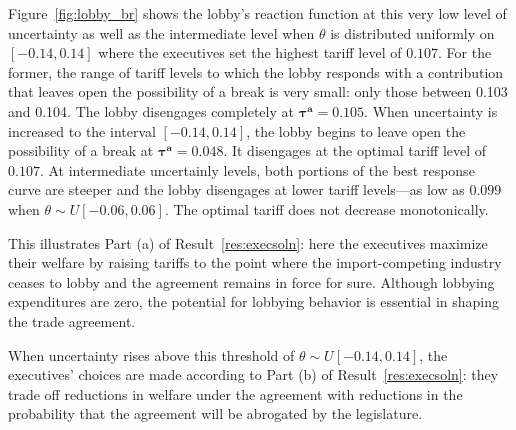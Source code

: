\documentclass[10pt]{article}
\newcommand{\ve}{\theta}
\newcommand{\bta}{\bm{\tau^a}}
\begin{document}
Figure~\ref{fig:lobby_br} shows the lobby's reaction function at this very low level of uncertainty as well as the intermediate level when $\ve$ is distributed uniformly on $[-0.14,0.14]$ where the executives set the highest tariff level of $0.107$. For the former, the range of tariff levels to which the lobby responds with a contribution that leaves open the possibility of a break is very small: only those between 0.103 and 0.104. The lobby disengages completely at $\bta=0.105$. When uncertainty is increased to the interval $[-0.14,0.14]$, the lobby begins to leave open the possibility of a break at $\bta = 0.048$. It disengages at the optimal tariff level of $0.107$. At intermediate uncertainly levels, both portions of the best response curve are steeper and the lobby disengages at lower tariff levels---as low as $0.099$ when $\ve \sim U[-0.06,0.06]$.  The optimal tariff does not decrease monotonically.

This illustrates Part (a) of Result~\ref{res:execsoln}: here the executives maximize their welfare by raising tariffs to the point where the import-competing industry ceases to lobby and the agreement remains in force for sure. Although lobbying expenditures are zero, the potential for lobbying behavior is essential in shaping the trade agreement.


When uncertainty rises above this threshold of $\ve \sim U[-0.14,0.14]$, the executives' choices are made according to Part (b) of Result~\ref{res:execsoln}: they trade off reductions in welfare under the agreement with reductions in the probability that the agreement will be abrogated by the legislature. %
\end{document}
